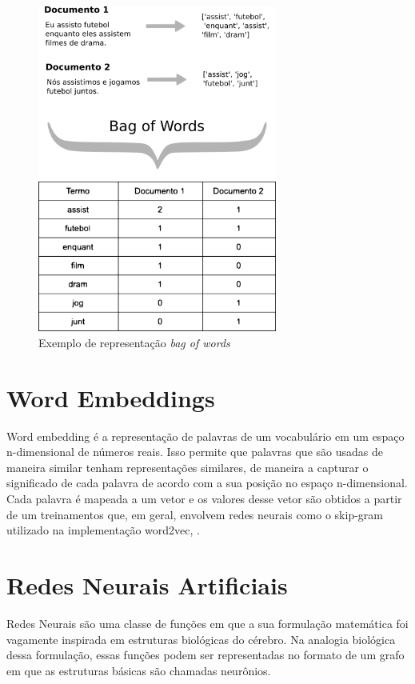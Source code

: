 \begin{figure}[!ht]
	\centering
	\includegraphics[width=0.7\textwidth]{figures/bag_of_words_example.png}
	\caption{Exemplo de representação \textit{bag of words}}
	\label{fig:bow_ex}
\end{figure}

\section{Word Embeddings}

Word embedding é a representação de palavras de um vocabulário em um espaço n-dimensional de números reais. Isso permite que palavras que são usadas de maneira similar tenham representações similares, de maneira a capturar o significado de cada palavra de acordo com a sua posição no espaço n-dimensional. Cada palavra é mapeada a um vetor e os valores desse vetor são obtidos a partir de um treinamentos que, em geral, envolvem redes neurais como o skip-gram utilizado na implementação word2vec, \cite{DBLP:journals/corr/MikolovSCCD13}.

\section{Redes Neurais Artificiais}

Redes Neurais são uma classe de funções em que a sua formulação matemática foi vagamente inspirada em estruturas biológicas do cérebro. Na analogia biológica dessa formulação, essas funções podem ser representadas no formato de um grafo em que as estruturas básicas são chamadas neurônios.

